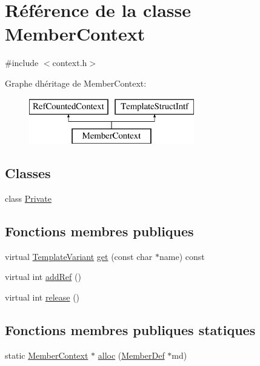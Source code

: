 \hypertarget{class_member_context}{}\section{Référence de la classe Member\+Context}
\label{class_member_context}


{\ttfamily \#include $<$context.\+h$>$}

Graphe d\textquotesingle{}héritage de Member\+Context\+:\begin{figure}[H]
\begin{center}
\leavevmode
\includegraphics[height=2.000000cm]{class_member_context}
\end{center}
\end{figure}
\subsection*{Classes}
\begin{DoxyCompactItemize}
\item 
class \hyperlink{class_member_context_1_1_private}{Private}
\end{DoxyCompactItemize}
\subsection*{Fonctions membres publiques}
\begin{DoxyCompactItemize}
\item 
virtual \hyperlink{class_template_variant}{Template\+Variant} \hyperlink{class_member_context_aaef7bb161d293921df2306a627fe6d5c}{get} (const char $\ast$name) const 
\item 
virtual int \hyperlink{class_member_context_abe50fc6291c9d139677b7a8263831d89}{add\+Ref} ()
\item 
virtual int \hyperlink{class_member_context_a92d2b4bfdec4af678bf20c69891fac29}{release} ()
\end{DoxyCompactItemize}
\subsection*{Fonctions membres publiques statiques}
\begin{DoxyCompactItemize}
\item 
static \hyperlink{class_member_context}{Member\+Context} $\ast$ \hyperlink{class_member_context_a2ec32013bfbba2255c64937529d5d5d6}{alloc} (\hyperlink{class_member_def}{Member\+Def} $\ast$md)
\end{DoxyCompactItemize}


